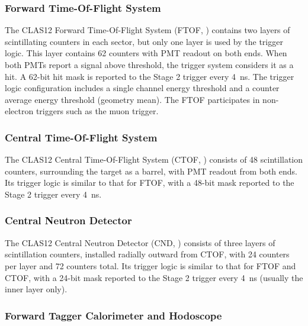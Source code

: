 \subsubsection{Forward Time-Of-Flight System}

The CLAS12 Forward Time-Of-Flight System (FTOF, \cite{ftof-ref}) contains two layers of scintillating counters in each sector, but only one layer is used by the trigger logic. This layer contains 62 counters with PMT readout on both ends. When both PMTs report a signal above threshold, the trigger system considers it as a hit. A 62-bit hit mask is reported to the Stage 2 trigger every 4~ns. The trigger logic configuration includes a single channel energy threshold and a counter average energy threshold (geometry mean). The FTOF participates in non-electron triggers such as the muon trigger.


\subsubsection{Central Time-Of-Flight System}

The CLAS12 Central Time-Of-Flight System (CTOF, \cite{ctof-ref}) consists of 48 scintillation counters, surrounding the target as a barrel, with PMT readout from both ends. Its trigger logic is similar to that for FTOF, with a 48-bit mask reported to the Stage 2 trigger every 4~ns.


\subsubsection{Central Neutron Detector}

The CLAS12 Central Neutron Detector (CND, \cite{cnd-ref}) consists of three layers of scintillation counters, installed radially outward from CTOF, with 24 counters per layer and 72 counters total. Its trigger logic is similar to that for FTOF and CTOF, with a 24-bit mask reported to the Stage 2 trigger every 4~ns (usually the inner layer only).


\subsubsection{Forward Tagger Calorimeter and Hodoscope}

